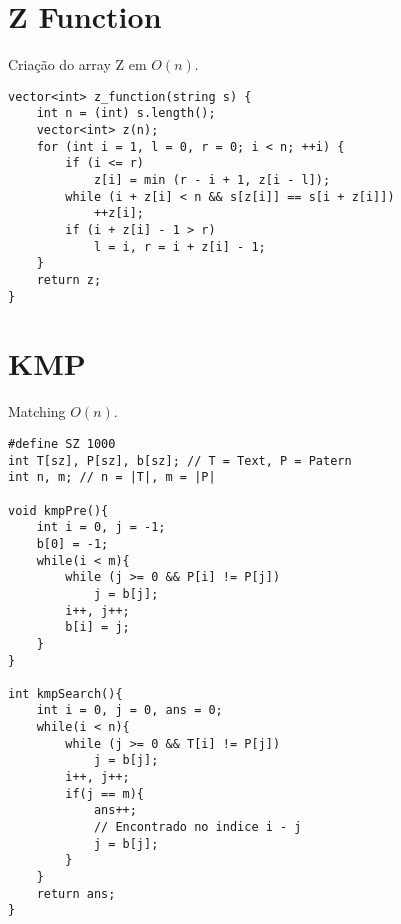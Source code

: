 \section{Z Function}
Criação do array Z em $O(n)$.
\begin{multicols}{2}
	\begin{lstlisting}
vector<int> z_function(string s) {
	int n = (int) s.length();
	vector<int> z(n);
	for (int i = 1, l = 0, r = 0; i < n; ++i) {
		if (i <= r)
			z[i] = min (r - i + 1, z[i - l]);
		while (i + z[i] < n && s[z[i]] == s[i + z[i]])
			++z[i];
		if (i + z[i] - 1 > r)
			l = i, r = i + z[i] - 1;
	}
	return z;
}
\end{lstlisting}
\end{multicols}
\section{KMP}
Matching $O(n)$.
\begin{multicols}{2}
	\begin{lstlisting}
#define SZ 1000
int T[sz], P[sz], b[sz]; // T = Text, P = Patern
int n, m; // n = |T|, m = |P|

void kmpPre(){
	int i = 0, j = -1;
	b[0] = -1;
	while(i < m){
		while (j >= 0 && P[i] != P[j])
			j = b[j];
		i++, j++;
		b[i] = j;
	}
}

int kmpSearch(){
	int i = 0, j = 0, ans = 0;
	while(i < n){
		while (j >= 0 && T[i] != P[j])
			j = b[j];
		i++, j++;
		if(j == m){
			ans++;
			// Encontrado no indice i - j
			j = b[j];
		}
	}	
	return ans;
}

\end{lstlisting}
\end{multicols}

